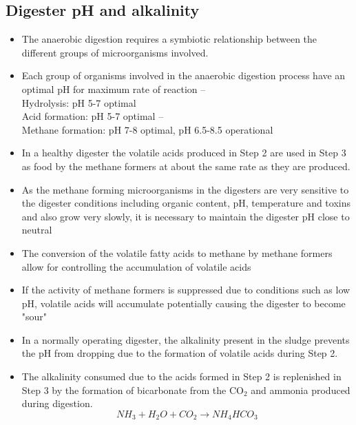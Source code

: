 \subsection{Digester pH and alkalinity}
                    \begin{itemize}
                        \item The anaerobic digestion requires a symbiotic relationship between the different groups of microorganisms involved. 
                        \item Each group of organisms involved in the anaerobic digestion process have an optimal pH for maximum rate of reaction – \\
                        Hydrolysis: pH 5-7 optimal\\ 
                        Acid formation: pH 5-7 optimal – \\
                        Methane formation: pH 7-8 optimal, pH 6.5-8.5 operational\\
                        \item In a healthy digester the volatile acids produced in Step 2 are used in Step 3 as food by the methane formers at about the same rate as they are produced.  
                        \item As the methane forming microorganisms in the digesters are very sensitive to the digester conditions including organic content, pH, temperature and toxins and also grow very slowly, it is necessary to maintain the digester pH close to neutral
                        \item The conversion of the volatile fatty acids to methane by methane formers allow for controlling the accumulation of volatile acids
                        \item If the activity of methane formers is suppressed due to conditions such as low pH, volatile acids will accumulate potentially causing the digester to become "sour"
                        \item In a normally operating digester, the alkalinity present in the sludge prevents the pH from dropping due to the formation of volatile acids during Step 2.
                        \item The alkalinity consumed due to the acids formed in Step 2 is replenished in Step 3 by the formation of bicarbonate from the CO$_2$ and ammonia produced during digestion.\\
                        $$NH_3+H_2O+CO_2 \to NH_4HCO_3$$  

\end{itemize}

